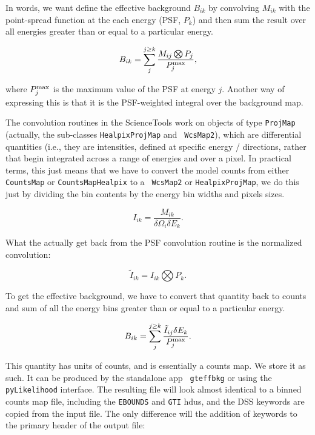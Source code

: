 \documentclass[preprint]{aastex}
\begin{document}
In words, we want define the effective background $B_{ik}$ by
convolving $M_{ik}$ with the point-spread function at the each energy
(PSF, $P_k$) and then sum the result over all energies greater than or
equal to a particular energy.

\begin{equation}
B_{ik} = \sum_{j}^{j \ge k} \frac{M_{ij} \bigotimes P_{j}}{P_{j}^{\rm max}}, 
\end{equation}

\noindent where $P_{j}^{\rm max}$ is the maximum value of the PSF at energy $j$.
Another way of expressing this is that it is the PSF-weighted integral over
the background map.  

The convolution routines in the ScienceTools work on objects of type
{\tt ProjMap} (actually, the sub-classes {\tt HealpixProjMap} and {\tt
  WcsMap2}), which are differential quantities (i.e., they are
intensities, defined at specific energy / directions, rather that
begin integrated across a range of energies and over a pixel.  In
practical terms, this just means that we have to convert the model
counts from either {\tt CountsMap} or {\tt CountsMapHealpix} to a {\tt
  WcsMap2} or {\tt HealpixProjMap}, we do this just by dividing the
bin contents by the energy bin widths and pixels sizes.

\begin{equation}
I_{ik} = \frac{M_{ik}}{\delta \Omega_i \delta E_k}.
\end{equation}

\noindent What the actually get back from the PSF convolution routine
is the normalized convolution:

\begin{equation}
\tilde{I}_{ik} = I_{ik} \bigotimes P_{k}.
\end{equation}

To get the effective background, we have to convert that quantity back
to counts and sum of all the energy bins greater than or equal to a
particular energy.

\begin{equation}
B_{ik} = \sum_{j}^{j \ge k} \frac{\tilde{I}_{ij} \delta E_k}{P_{j}^{\rm max}}.
\end{equation}

This quantity has units of counts, and is essentially a counts map.
We store it as such.  It can be produced by the standalone app {\tt
  gteffbkg} or using the {\tt pyLikelihood} interface.  The resulting
file will look almost identical to a binned counts map file, including
the {\tt EBOUNDS} and {\tt GTI} hdus, and the DSS keywords are copied
from the input file.  The only difference will the addition of
keywords to the primary header of the output file:
\end{document}
